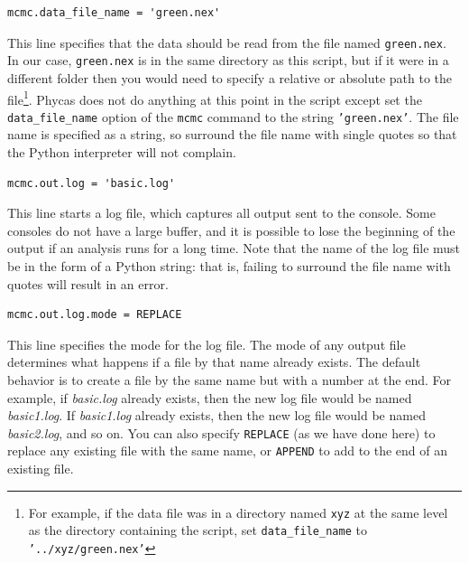\documentclass[10pt]{article}
\newcommand{\pathname}[1]{{\em #1}}			%
\newcommand{\code}[1]{{\tt #1}}				%
\newcommand{\cmd}[1]{{\tt \small #1}\index{#1}}		%
\newcommand{\opt}[1]{{\tt \small #1}\index{#1}}		%
\begin{document}
\begin{samepage}
\begin{verbatim}
mcmc.data_file_name = 'green.nex'
\end{verbatim}
This line specifies that the data should be read from the file named {\tt green.nex}. In our case, {\tt green.nex} is in the same directory as this script, but if it were in a different folder then you would need to specify a relative or absolute path to the file\footnote{
%
For example, if the data file was in a directory named {\tt xyz} at the same level as the directory containing the script, set \opt{data\_file\_name} to {\tt '../xyz/green.nex'} }.
%
Phycas does not do anything at this point in the script except set the \opt{data\_file\_name} option of the \cmd{mcmc} command to the string \code{'green.nex'}. The file name is specified as a string, so surround the file name with single quotes so that the Python interpreter will not complain. 
\end{samepage}

\begin{samepage}
\begin{verbatim}
mcmc.out.log = 'basic.log'
\end{verbatim}
This line starts a log file, which captures all output sent to the console. Some consoles do not have a large buffer, and it is possible to lose the beginning of the output if an analysis runs for a long time. Note that the name of the log file must be in the form of a Python string: that is, failing to surround the file name with quotes will result in an error.
\end{samepage}

\begin{samepage}
\begin{verbatim}
mcmc.out.log.mode = REPLACE
\end{verbatim}
This line specifies the mode for the log file. The mode of any output file determines what happens if a file by that name already exists. The default behavior is to create a file by the same name but with a number at the end. For example, if \pathname{basic.log} already exists, then the new log file would be named \pathname{basic1.log}. If \pathname{basic1.log} already exists, then the new log file would be named \pathname{basic2.log}, and so on. You can also specify \code{REPLACE} (as we have done here) to replace any existing file with the same name, or \code{APPEND} to add to the end of an existing file. 
\end{samepage}
\end{document}
